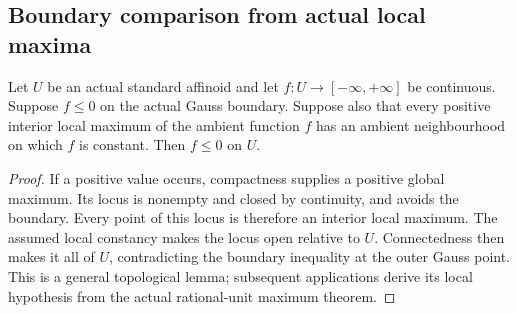 \subsection{Boundary comparison from actual local maxima}\label{subsec:fc-line-boundary-comparison}

\begin{lemma}\label{lem:fc-line-boundary-comparison}
\leanok
{}
Let $U$ be an actual standard affinoid and let $f:U\to[-\infty,+\infty]$
be continuous. Suppose $f\le0$ on the actual Gauss boundary. Suppose also
that every positive interior local maximum of the ambient function $f$
has an ambient neighbourhood on which $f$ is constant. Then $f\le0$ on $U$.
\end{lemma}

\begin{proof}
If a positive value occurs, compactness supplies a positive global maximum.
Its locus is nonempty and closed by continuity, and avoids the boundary.
Every point of this locus is therefore an interior local maximum. The
assumed local constancy makes the locus open relative to $U$. Connectedness
then makes it all of $U$, contradicting the boundary inequality at the outer
Gauss point. This is a general topological lemma; subsequent applications
derive its local hypothesis from the actual rational-unit maximum theorem.
\end{proof}
